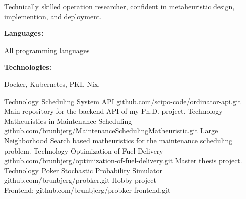 \documentclass[9pt]{developercv} %
\begin{document}
\begin{minipage}[t]{0.46\textwidth}
	\vspace{-6pt}
 
	Technically skilled operation researcher, confident in metaheuristic design, implemention, and deployment.
\end{minipage}
\hfill %
\begin{minipage}[t]{0.465\textwidth}
    \vspace{-6pt}
    
    \begin{minipage}[t]{0.2\textwidth}
        \textbf{Languages:}
    \end{minipage}
    \hfill
    \begin{minipage}[t]{0.73\textwidth}
	  All programming languages
    \end{minipage}
    \vspace{4mm}
    
    \begin{minipage}[t]{0.2\textwidth}
        \textbf{Technologies:}
    \end{minipage}
    \hfill
    \begin{minipage}[t]{0.73\textwidth}
    	Docker, Kubernetes, PKI, Nix.
    \end{minipage}
    
\end{minipage}

\begin{entrylist}
    \entry
		{Technology}
		{Scheduling System API}
		{github.com/scipo-code/ordinator-api.git}
		{
        	Main repository for the backend API of my Ph.D. project.
		}
	\entry
		{Technology}
		{Matheuristics in Maintenance Scheduling}
		{github.com/brunbjerg/MaintenanceSchedulingMatheuristic.git}
		{ 
			Large Neighborhood Search based matheuristics for the maintenance scheduling problem.
		}
    \entry
		{Technology}
		{Optimization of Fuel Delivery}
		{github.com/brunbjerg/optimization-of-fuel-delivery.git}
		{ 
			Master thesis project. 
		}
    \entry
		{Technology}
		{Poker Stochastic Probability Simulator}
		{
			github.com/brunbjerg/probker.git
		}
		{ 
			Hobby project \\ 
			Frontend: github.com/brunbjerg/probker-frontend.git
		}
\end{entrylist}
\end{document}
